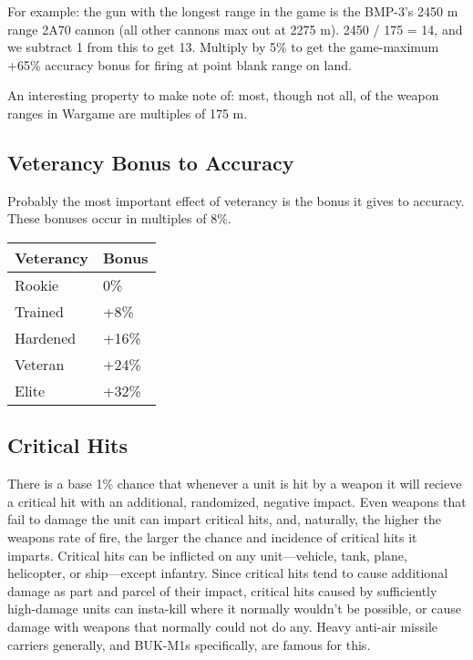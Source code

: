 \documentclass{article}
\begin{document}
For example: the gun with the longest range in the game is the BMP-3's 2450 m
range 2A70 cannon (all other cannons max out at 2275 m). 2450 / 175 = 14, and we
subtract 1 from this to get 13. Multiply by 5\% to get the game-maximum +65\%
accuracy bonus for firing at point blank range on land.

An interesting property to make note of: most, though not all, of the weapon
ranges in Wargame are multiples of 175 m.

\subsection{Veterancy Bonus to Accuracy}

Probably the most important effect of veterancy is the bonus it gives to
accuracy. These bonuses occur in multiples of 8\%.

\begin{center}
    \begin{tabular}{ | l | l | }
    \hline
    Veterancy & Bonus \\ \hline
    Rookie & 0\% \\
    Trained & +8\% \\ 
    Hardened & +16\% \\ 
    Veteran & +24\% \\ 
    Elite & +32\% \\
    \hline
    \end{tabular}
\end{center}

\subsection{Critical Hits}

There is a base 1\% chance that whenever a unit is hit by a weapon it will
recieve a critical hit with an additional, randomized, negative impact. Even
weapons that fail to damage the unit can impart critical hits, and, naturally,
the higher the weapons rate of fire, the larger the chance and incidence of
critical hits it imparts. Critical hits can be inflicted on any unit---vehicle,
tank, plane, helicopter, or ship---except infantry. Since critical hits tend to
cause additional damage as part and parcel of their impact, critical hits caused
by sufficiently high-damage units can insta-kill where it normally wouldn't be
possible, or cause damage with weapons that normally could not do any. Heavy
anti-air missile carriers generally, and BUK-M1s specifically, are famous for
this.
\end{document}
